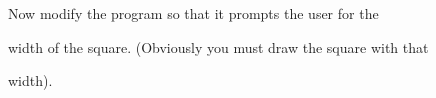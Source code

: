 Now modify the program so that it prompts the user for the

width of the square. (Obviously you must draw the square with that

width).

